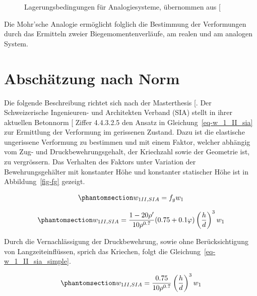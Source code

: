 \documentclass[
  12pt,
  letterpaper,
  egregdoesnotlikesansseriftitles]{scrreprt}
\begin{document}
\begin{figure}[H]


\caption{\label{fig-randbedingungen_analogiesysteme}Lagerungsbedingungen
für Analogiesysteme, übernommen aus
{[}\citeproc{ref-Spathelf2022}{4}{]}}

\end{figure}%

Die Mohr'sche Analogie ermöglicht folglich die Bestimmung der
Verformungen durch das Ermitteln zweier Biegemomentenverläufe, am realen
und am analogen System.

\section{Abschätzung nach Norm}\label{sec-norm}

Die folgende Beschreibung richtet sich nach der Masterthesis
{[}\citeproc{ref-Stecher2022}{5}{]}. Der Schweizerische Ingenieuren- und
Architekten Verband (SIA) stellt in ihrer aktuellen Betonnorm
{[}\citeproc{ref-SIA2013a}{6}{]} Ziffer 4.4.3.2.5 den Ansatz in
Gleichung~\ref{eq-w_1_II_sia} zur Ermittlung der Verformung im
gerissenen Zustand. Dazu ist die elastische ungerissene Verformung zu
bestimmen und mit einem Faktor, welcher abhängig vom Zug- und
Druckbewehrungsgehalt, der Kriechzahl sowie der Geometrie ist, zu
vergrössern. Das Verhalten des Faktors unter Variation der
Bewehrungsgehälter mit konstanter Höhe und konstanter statischer Höhe
ist in Abbildung~\ref{fig-fg} gezeigt.

\begin{equation}\phantomsection\label{eq-w_1_II_sia_faktor}{
w_{1II,SIA} = f_g w_1
}\end{equation}

\begin{equation}\phantomsection\label{eq-w_1_II_sia}{
w_{1II,SIA} = \frac{1-20\rho'}{10\rho^{0.7}}(0.75+0.1\varphi)\left(\frac{h}{d}\right)^3 w_1
}\end{equation}

Durch die Vernachlässigung der Druckbewehrung, sowie ohne
Berücksichtigung von Langzeiteinflüssen, sprich das Kriechen, folgt die
Gleichung~\ref{eq-w_1_II_sia_simple}.

\begin{equation}\phantomsection\label{eq-w_1_II_sia_simple}{
w_{1II,SIA} = \frac{0.75}{10\rho^{0.7}}\left(\frac{h}{d}\right)^3 w_1
}\end{equation}
\end{document}
